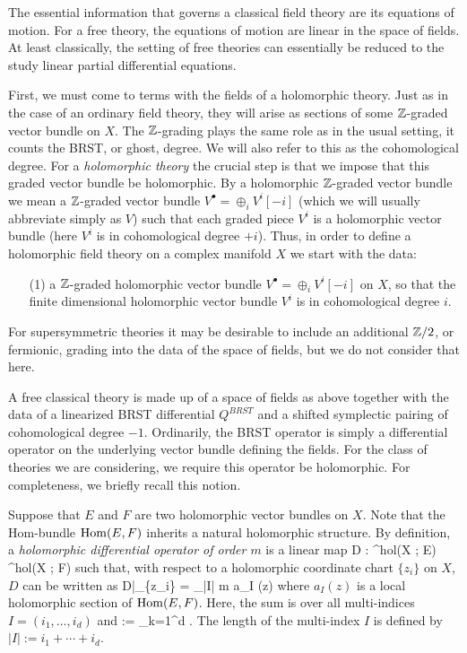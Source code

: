 \documentclass[11pt]{amsart}
\begin{document}
The essential information that governs a classical field theory are its equations of motion. 
For a free theory, the equations of motion are linear in the space of fields.
At least classically, the setting of free theories can essentially be reduced to the study linear partial differential equations.

First, we must come to terms with the fields of a holomorphic theory. 
Just as in the case of an ordinary field theory, they will arise as sections of some $\mathbb Z$-graded vector bundle on $X$.
The $\mathbb Z$-grading plays the same role as in the usual setting, it counts the BRST, or ghost, degree. 
We will also refer to this as the cohomological degree.
For a {\em holomorphic theory} the crucial step is that we impose that this graded vector bundle be holomorphic.  
By a holomorphic $\mathbb Z$-graded vector bundle we mean a $\mathbb Z$-graded vector bundle $
V^\bullet = \oplus_i V^i [-i]$ (which we will usually abbreviate simply as $V$) such that each graded piece $V^i$ is a holomorphic vector bundle (here $V^i$ is in cohomological degree $+i$).
Thus, in order to define a holomorphic field theory on a complex manifold $X$ we start with the data:

\begin{itemize}
\item[(1)] a $\mathbb Z$-graded holomorphic vector bundle $V^\bullet = \oplus_i V^i [-i]$ on $X$, so that the finite dimensional holomorphic vector bundle $V^i$ is in cohomological degree $i$. 
\end{itemize}

\begin{rmk}
For supersymmetric theories it may be desirable to include an additional $\mathbb Z/2$, or fermionic, grading into the data of the space of fields, but we do not consider that here.
\end{rmk}

A free classical theory is made up of a space of fields as above together with the data of a linearized BRST differential $Q^{BRST}$ and a shifted symplectic pairing of cohomological degree $-1$. 
Ordinarily, the BRST operator is simply a differential operator on the underlying vector bundle defining the fields. 
For the class of theories we are considering, we require this operator be holomorphic. 
For completeness, we briefly recall this notion.

Suppose that $E$ and $F$ are two holomorphic vector bundles on $X$.
Note that the Hom-bundle ${\rm Hom}(E,F)$ inherits a natural holomorphic structure. 
By definition, a {\em holomorphic differential operator of order $m$} is a linear map
\ben
D : \Gamma^{hol}(X ; E) \to \Gamma^{hol}(X ; F)
\een
such that, with respect to a holomorphic coordinate chart $\{z_i\}$ on $X$, $D$ can be written as
\be\label{local holomorphic}
D|_{\{z_i\}} = \sum_{|I| \leq m} a_I (z) 
\ee
where $a_I(z)$ is a local holomorphic section of ${\rm Hom}(E,F)$.
Here, the sum is over all multi-indices $I = (i_1,\ldots, i_d)$ and 
\ben
{} := \prod_{k=1}^d  . 
\een 
The length of the multi-index $I$ is defined by $|I| := i_1 + \cdots + i_d$. 
\end{document}
